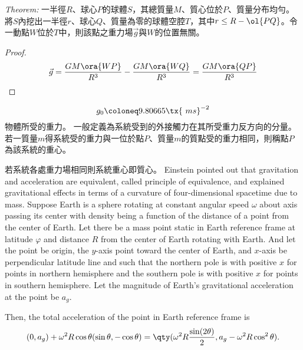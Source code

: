 \documentclass[a4paper,12pt]{article}
\begin{document}
\textit{Theorem:} 一半徑$R$、球心$P$的球體$S$，其總質量$M$、質心位於$P$、質量分布均勻。將$S$內挖出一半徑$r$、球心$Q$、質量為零的球體空腔$T$，其中$r\leq R-\ol{PQ}$。令一動點$W$位於$T$中，則該點之重力場$\vec{g}$與$W$的位置無關。
\begin{proof}
\[\vec{g}=\frac{GM\ora{WP}}{R^3}-\frac{GM\ora{WQ}}{R^3}=\frac{GM\ora{QP}}{R^3}\]
\end{proof}
\[g_0\coloneq 9.80665 \tx{\ m s}^{-2}\]
物體所受的重力。
一般定義為系統受到的外接觸力在其所受重力反方向的分量。
若一質量$m$得系統受的重力與一位於點$P$、質量$m$的質點受的重力相同，則稱點$P$為該系統的重心。

若系統各處重力場相同則系統重心即質心。
Einstein pointed out that gravitation and acceleration are equivalent, called principle of equivalence, and explained gravitational effects in terms of a curvature of four-dimensional spacetime due to mass.
Suppose Earth is a sphere rotating at constant angular speed $\omega$ about axis passing its center with density being a function of the distance of a point from the center of Earth. Let there be a mass point static in Earth reference frame at latitude $\varphi$ and distance $R$ from the center of Earth rotating with Earth. And let the point be origin, the $y$-axis point toward the center of Earth, and $x$-axis be perpendicular latitude line and such that the northern pole is with positive $x$ for points in northern hemisphere and the southern pole is with positive $x$ for points in southern hemisphere. Let the magnitude of Earth's gravitational acceleration at the point be $a_g$.

Then, the total acceleration of the point in Earth reference frame is
\[(0,a_g)+\omega^2R\cos\theta(\sin\theta,-\cos\theta)=\qty(\omega^2R\frac{\sin(2\theta)}{2},a_g-\omega^2R\cos^2\theta).\]
\end{document}

